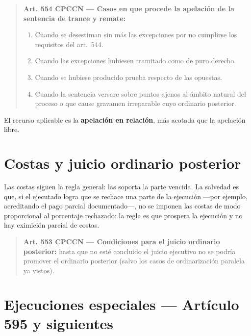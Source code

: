 \documentclass[12pt,oneside]{book}
\begin{document}
\begin{quote}
\textbf{Art. 554 CPCCN --- Casos en que procede la apelación de la sentencia de trance y remate:}
\begin{enumerate}[label=\alph*),leftmargin=2.2em]
    \item Cuando se desestiman sin más las excepciones por no cumplirse los requisitos del art.~544.
    \item Cuando las excepciones hubiesen tramitado como de puro derecho.
    \item Cuando se hubiese producido prueba respecto de las opuestas.
    \item Cuando la sentencia versare sobre puntos ajenos al ámbito natural del proceso o que cause gravamen irreparable cuyo ordinario posterior.
\end{enumerate}
\end{quote}

El recurso aplicable es la \textbf{apelación en relación}, más acotada que la apelación libre.

\section{Costas y juicio ordinario posterior}

Las costas siguen la regla general: las soporta la parte vencida. La salvedad es que, si el ejecutado logra que se rechace una parte de la ejecución ---por ejemplo, acreditando el pago parcial documentado---, no se imponen las costas de modo proporcional al porcentaje rechazado: la regla es que prospera la ejecución y no hay eximición parcial de costas.

\begin{quote}
\textbf{Art. 553 CPCCN --- Condiciones para el juicio ordinario posterior:} hasta que no esté concluido el juicio ejecutivo no se podría promover el ordinario posterior (salvo los casos de ordinarización paralela ya vistos).
\end{quote}

\section{Ejecuciones especiales --- Artículo 595 y siguientes}
\end{document}
